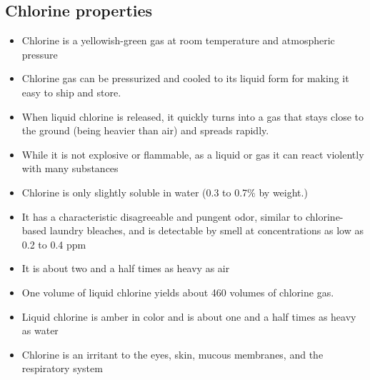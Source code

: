\subsection{Chlorine properties}
\begin{itemize}
\item Chlorine is a yellowish-green gas at room temperature and atmospheric pressure
\item Chlorine gas can be pressurized and cooled to its liquid form for making it easy to ship and store. 
\item When liquid chlorine is released, it quickly turns into a gas that stays close to the ground (being heavier than air) and spreads rapidly.
\item While it is not explosive or flammable, as a liquid or gas it can react violently with many substances 
\item Chlorine is only slightly soluble in water (0.3 to 0.7\% by weight.) 
\item It has a characteristic disagreeable and pungent odor, similar to chlorine-based laundry bleaches, and is detectable by smell at concentrations as low as 0.2 to 0.4 ppm
\item It is about two and a half times as heavy as air
\item One volume of liquid chlorine yields about 460 volumes of chlorine gas. 
\item Liquid chlorine is amber in color and is about one and a half times as heavy as water 
\item Chlorine is an irritant to the eyes, skin, mucous membranes, and the respiratory system 
\end{itemize}

